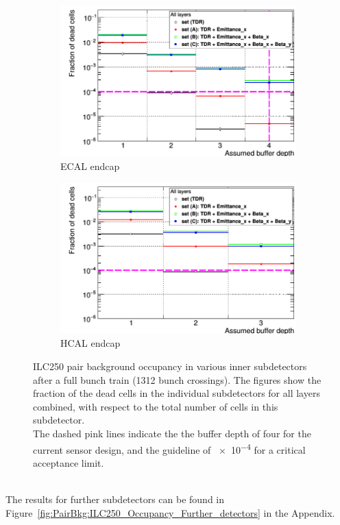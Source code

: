 \begin{figure}
\begin{subfigure}[b]{0.49\textwidth}
    \includegraphics[width=\textwidth]{Figures/Pairs/Appendix/Occupancy_Comparison_All_layers_deadcells_ILC250_ALL_SETS_ECALEndcap.png}
   \caption{\sid ECAL endcap}
   \end{subfigure}
   \hfill
    \begin{subfigure}[b]{0.49\textwidth}
   \centering
    \includegraphics[width=\textwidth]{Figures/Pairs/Appendix/Occupancy_Comparison_All_layers_deadcells_ILC250_ALL_SETS_HCALEndcap.png}
   \caption{\sid HCAL endcap}
   \end{subfigure}
   \caption[Pair background occupancy in various inner \sid subdetectors for the ILC250]{ILC250 pair background occupancy in various inner \sid subdetectors after a full bunch train (1312 bunch crossings).
   The figures show the fraction of the dead cells in the individual subdetectors for all layers combined, with respect to the total number of cells in this subdetector.
   \\The dashed pink lines indicate the the buffer depth of four for the current sensor design, and the guideline of \num{e-4} for a critical acceptance limit.
   }
   \label{fig:PairBkg:ILC250_Occupancy_Inner_detectors}
\end{figure}
\\The results for further subdetectors can be found in Figure~\ref{fig:PairBkg:ILC250_Occupancy_Further_detectors} in the Appendix.

